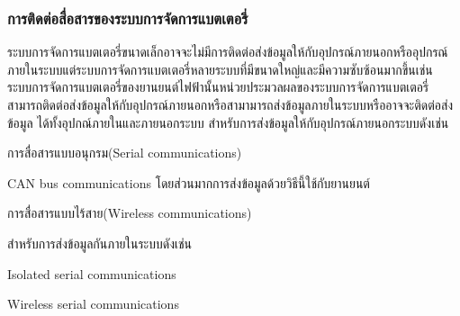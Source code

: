 \subsubsection*{การติดต่อสื่อสารของระบบการจัดการแบตเตอรี่}
ระบบการจัดการแบตเตอรี่ขนาดเล็กอาจจะไม่มีการติดต่อส่งข้อมูลให้กับอุปกรณ์ภายนอกหรืออุปกรณ์ภายในระบบแต่ระบบการจัดการแบตเตอรี่หลายระบบที่มีขนาดใหญ่และมีความซับซ้อนมากขึ้นเช่น
ระบบการจัดการแบตเตอรี่ของยานยนต์ไฟฟ้านั้นหน่วยประมวลผลของระบบการจัดการแบตเตอรี่สามารถติดต่อส่งข้อมูลให้กับอุปกรณ์ภายนอกหรือสามามารถส่งข้อมูลภายในระบบหรืออาจจะติดต่อส่งข้อมูล
ได้ทั้งอุปกณ์ภายในและภายนอกระบบ\newline
สำหรับการส่งข้อมูลให้กับอุปกรณ์ภายนอกระบบดังเช่น
\begin{itemize}
	{\item 	การสื่อสารแบบอนุกรม(Serial communications)}
	{\item 	CAN bus communications โดยส่วนมากการส่งข้อมูลด้วยวิธีนี้ใช้กับยานยนต์}
	{\item 	การสื่อสารแบบไร้สาย(Wireless communications)}
\end{itemize}
สำหรับการส่งข้อมูลกันภายในระบบดังเช่น
\begin{itemize}
	{\item 	Isolated serial communications}
	{\item 	Wireless serial communications}
\end{itemize}
































